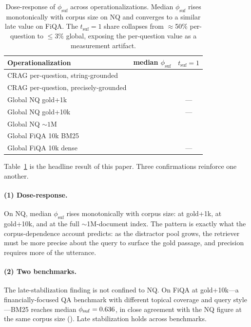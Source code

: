 \begin{table}[t]
\centering
\caption{Dose-response of $\phi_{\mathrm{suf}}$ across operationalizations.
Median $\phi_{\mathrm{suf}}$ rises monotonically with corpus size on NQ and
converges to a similar late value on FiQA. The $t_{\mathrm{suf}}{=}1$ share
collapses from $\approx$50\% per-question to $\leq$3\% global, exposing the
per-question value as a measurement artifact.}
\label{tab:corpus-dependence}
\begin{tabular}{lcc}
\toprule
Operationalization & median $\phi_{\mathrm{suf}}$ & $t_{\mathrm{suf}}{=}1$ \\
\midrule
CRAG per-question, string-grounded   & \phiSufMed{}      & \tSufOneAll{} \\
CRAG per-question, precisely-grounded & \phiSufCleanMed{} & \tSufOneClean{} \\
\midrule
Global NQ gold+1k                    & \phiSufGnqK{}     & ---           \\
Global NQ gold+10k                   & \phiSufGnqTenK{}  & ---           \\
Global NQ ${\sim}1$M                 & \phiSufGnqOneM{}  & \tSufOneGnqOneM{} \\
\midrule
Global FiQA 10k BM25                 & \phiSufGfiqaBm{}  & \tSufOneGfiqaBm{} \\
Global FiQA 10k dense                & \phiSufGfiqaDe{}  & ---           \\
\bottomrule
\end{tabular}
\end{table}

Table~\ref{tab:corpus-dependence} is the headline result of this paper. Three
confirmations reinforce one another.

\paragraph{(1) Dose-response.} On NQ, median $\phi_{\mathrm{suf}}$ rises
monotonically with corpus size: \phiSufGnqK{} at gold+1k, \phiSufGnqTenK{} at
gold+10k, and \phiSufGnqOneM{} at the full ${\sim}$1M-document index.
The pattern is exactly what the corpus-dependence account predicts: as the
distractor pool grows, the retriever must be more precise about the query to
surface the gold passage, and precision requires more of the utterance.

\paragraph{(2) Two benchmarks.} The late-stabilization finding is not confined to
NQ. On FiQA at gold+10k---a financially-focused QA benchmark with different
topical coverage and query style---BM25 reaches median $\phi_{\mathrm{suf}} =
0.636{}$, in close agreement with the NQ figure at the same corpus size
(\phiSufGnqTenK{}). Late stabilization holds across benchmarks.


